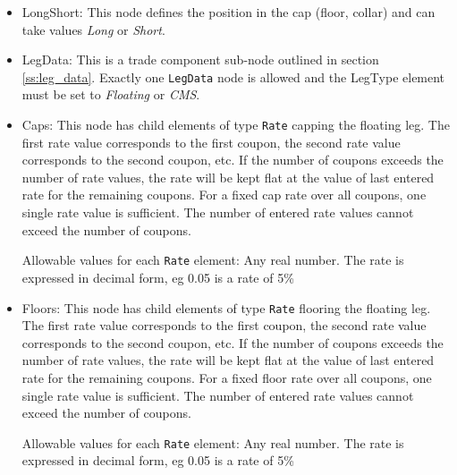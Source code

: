 \begin{itemize}

\item LongShort: This node defines the position in the cap (floor, collar) and can take values \emph{Long} or \emph{Short}.

\item LegData: This is a trade component sub-node outlined in section \ref{ss:leg_data}. Exactly
  one \lstinline!LegData! node is allowed and the LegType element must be set to \emph{Floating} or \emph{CMS}.

\item Caps: This node has child elements of type \lstinline!Rate!
  capping the floating leg. The first rate value corresponds to the
  first coupon, the second rate value corresponds to the second
  coupon, etc. If the number of coupons exceeds the number of rate
  values, the rate will be kept flat at the value of last entered rate
  for the remaining coupons. For a fixed cap rate over all coupons,
  one single rate value is sufficient. The number of entered rate
  values cannot exceed the number of coupons. 

  Allowable values for each \lstinline!Rate! element: Any real number. The rate is expressed in decimal form, eg 0.05 is
  a rate of 5\%

\item Floors: This node has child elements of type
  \lstinline!Rate! flooring the floating leg.  The first rate value
  corresponds to the first coupon, the second rate value corresponds
  to the second coupon, etc. If the number of coupons exceeds the
  number of rate values, the rate will be kept flat at the value of
  last entered rate for the remaining coupons. For a fixed floor rate
  over all coupons, one single rate value is sufficient. The number of
  entered rate values cannot exceed the number of coupons.

  Allowable values for each \lstinline!Rate! element: Any real number. The rate is expressed in decimal form, eg 0.05 is
  a rate of 5\%

\end{itemize}
